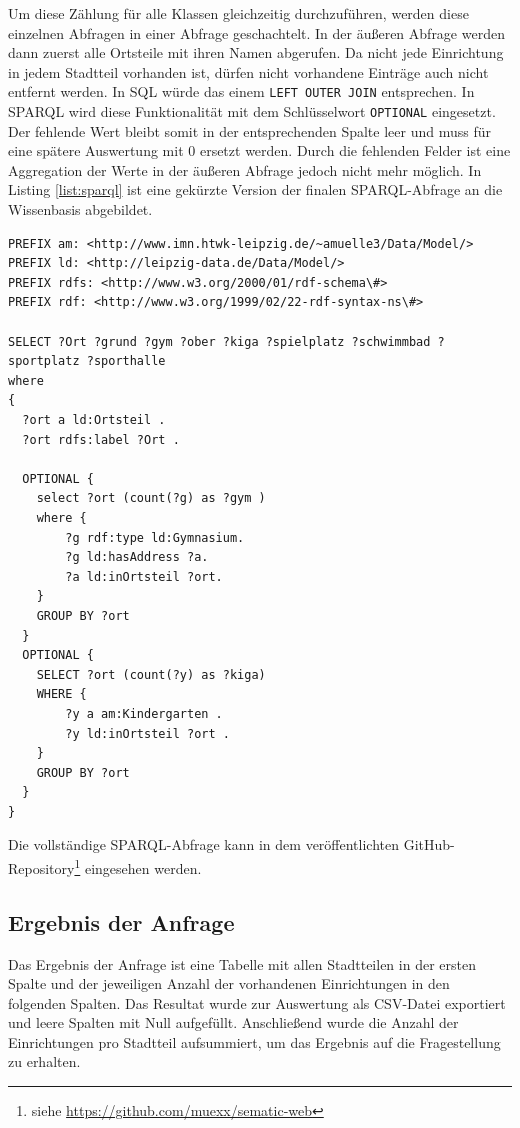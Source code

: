 \documentclass[parskip]{scrartcl}
\begin{document}
Um diese Zählung für alle Klassen gleichzeitig durchzuführen, werden diese einzelnen Abfragen in einer Abfrage  geschachtelt. In der äußeren Abfrage werden dann zuerst alle Ortsteile mit ihren Namen abgerufen. Da nicht jede Einrichtung in jedem Stadtteil vorhanden ist, dürfen nicht vorhandene Einträge auch nicht entfernt werden. In SQL würde das einem \texttt{LEFT OUTER JOIN} entsprechen. In SPARQL wird diese Funktionalität mit dem Schlüsselwort \texttt{OPTIONAL} eingesetzt. Der fehlende Wert bleibt somit in der entsprechenden Spalte leer und muss für eine spätere Auswertung mit 0 ersetzt werden. Durch die fehlenden Felder ist eine Aggregation der Werte in der äußeren Abfrage jedoch nicht mehr möglich. In Listing \ref{list:sparql} ist eine gekürzte Version der finalen SPARQL-Abfrage an die Wissenbasis abgebildet.

\begin{lstlisting}[caption={SPARQL-Anfrage}, label={list:sparql}]
PREFIX am: <http://www.imn.htwk-leipzig.de/~amuelle3/Data/Model/>
PREFIX ld: <http://leipzig-data.de/Data/Model/>
PREFIX rdfs: <http://www.w3.org/2000/01/rdf-schema\#>
PREFIX rdf: <http://www.w3.org/1999/02/22-rdf-syntax-ns\#>

SELECT ?Ort ?grund ?gym ?ober ?kiga ?spielplatz ?schwimmbad ?sportplatz ?sporthalle
where
{
  ?ort a ld:Ortsteil .
  ?ort rdfs:label ?Ort .
  
  OPTIONAL {
    select ?ort (count(?g) as ?gym )
    where {
        ?g rdf:type ld:Gymnasium.
        ?g ld:hasAddress ?a.
        ?a ld:inOrtsteil ?ort.
    }
    GROUP BY ?ort
  }
  OPTIONAL {
    SELECT ?ort (count(?y) as ?kiga)
    WHERE {
        ?y a am:Kindergarten .
        ?y ld:inOrtsteil ?ort . 
    }
    GROUP BY ?ort  
  }
}
\end{lstlisting}

Die vollständige SPARQL-Abfrage kann in dem veröffentlichten GitHub-Repository\footnote{siehe \url{https://github.com/muexx/sematic-web}} eingesehen werden.


\subsection{Ergebnis der Anfrage}
Das Ergebnis der Anfrage ist eine Tabelle mit allen Stadtteilen in der ersten Spalte und der jeweiligen Anzahl der vorhandenen Einrichtungen in den folgenden Spalten. Das Resultat wurde zur Auswertung als CSV-Datei exportiert und leere Spalten mit Null aufgefüllt. Anschließend wurde die Anzahl der Einrichtungen pro Stadtteil aufsummiert, um das Ergebnis auf die Fragestellung zu erhalten.
\end{document}
